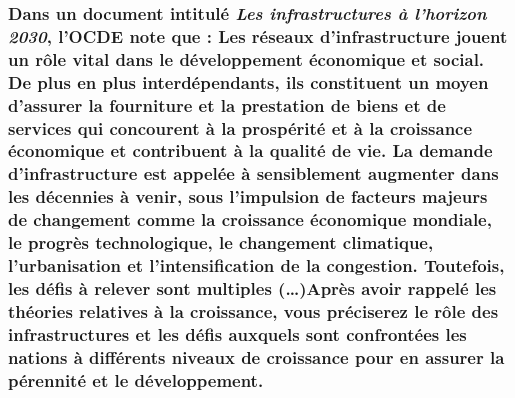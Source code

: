 \newpage %
	\subsubsection*{Dans un document intitulé \guillemetleft \textit{Les infrastructures à l’horizon 2030}\guillemetright,  l’OCDE note que : \newline \guillemetleft Les réseaux d’infrastructure jouent un rôle vital dans le développement économique et social. De plus en plus interdépendants, ils constituent un moyen d’assurer la fourniture et la prestation de biens et de services qui concourent à la prospérité et à la croissance économique et contribuent à la qualité de vie. La demande d’infrastructure est appelée à sensiblement augmenter dans les décennies à venir, sous l’impulsion de facteurs majeurs de changement comme la croissance économique mondiale, le progrès technologique, le changement climatique, l’urbanisation et l’intensification de la congestion. Toutefois, les défis à relever sont multiples (…)\guillemetright \newline \newline Après avoir rappelé les théories relatives à la croissance, vous préciserez le rôle des infrastructures et les défis auxquels sont confrontées les nations à différents niveaux de croissance pour en assurer la pérennité et le développement. }


